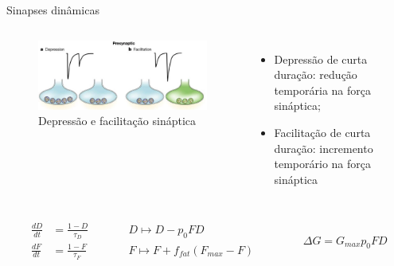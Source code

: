 \begin{frame}{Sinapses dinâmicas}
	\begin{columns}[t]
		\column{5cm}
			\begin{figure}[tb]
				\centering
				\caption{Depressão e facilitação sináptica}
				\label{fig:plasticidadecurtaduracao}
				\includegraphics[width=0.9\linewidth]{figs/plasticidade_curta_duracao}
			\end{figure}
		\column{5cm}
			\begin{itemize}
				\item Depressão de curta duração: redução temporária na força sináptica;
				\item Facilitação de curta duração: incremento temporário na força sináptica
			\end{itemize}
	\end{columns}
	\[
		\begin{aligned}
			\frac{dD}{dt}&=\frac{1-D}{\tau_D} &\qquad &D\mapsto D-p_0FD\\
			\frac{dF}{dt}&=\frac{1-F}{\tau_F} &\qquad &F\mapsto F+f_{fat}(F_{max}-F)
		\end{aligned}
		\qquad\qquad \Delta G=G_{max}p_0FD
	\]
\end{frame}

